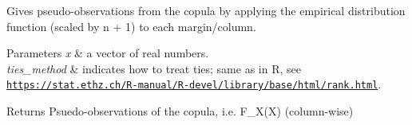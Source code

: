 Gives pseudo-\/observations from the copula by applying the empirical distribution function (scaled by n + 1) to each margin/column.


\begin{DoxyParams}{Parameters}
{\em x} & a vector of real numbers. \\
\hline
{\em ties\+\_\+method} & indicates how to treat ties; same as in R, see \href{https://stat.ethz.ch/R-manual/R-devel/library/base/html/rank.html}{\tt https\+://stat.\+ethz.\+ch/\+R-\/manual/\+R-\/devel/library/base/html/rank.\+html}. \\
\hline
\end{DoxyParams}
\begin{DoxyReturn}{Returns}
Psuedo-\/observations of the copula, i.\+e. F\+\_\+\+X(\+X) (column-\/wise) 
\end{DoxyReturn}
